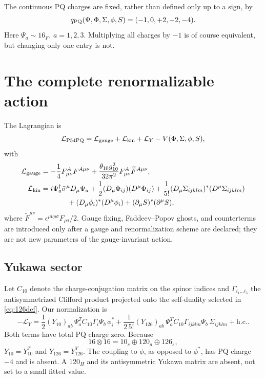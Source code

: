 \documentclass[11pt]{article}
\newcommand{\hc}{\mathrm{h.c.}}
\newcommand{\Lag}{\mathcal L}
\begin{document}
The continuous PQ charges are fixed, rather than defined only up to a sign,
by
\begin{equation}
 q_{\rm PQ}(\Psi,\Phi,\Sigma,\phi,S)=(-1,0,+2,-2,-4).
 \label{eq:pqcharges}
\end{equation}
Here $\Psi_a\sim16_F$, $a=1,2,3$.  Multiplying all charges by $-1$ is of
course equivalent, but changing only one entry is not.

\section{The complete renormalizable action}

The Lagrangian is
\begin{equation}
 \Lag_{\rm P54PQ}=\Lag_{\rm gauge}+\Lag_{\rm kin}
 +\Lag_Y-V(\Phi,\Sigma,\phi,S),
 \label{eq:full-action}
\end{equation}
with
\begin{align}
 \Lag_{\rm gauge}&=-\frac14F^A_{\mu\nu}F^{A\mu\nu}
 +\frac{\theta_{10}g_{10}^2}{32\pi^2}
 F^A_{\mu\nu}\widetilde F^{A\mu\nu},\\
 \Lag_{\rm kin}&=i\Psi_a^\dagger\bar\sigma^\mu D_\mu\Psi_a
 +\frac12(D_\mu\Phi_{ij})(D^\mu\Phi_{ij})
 +\frac1{5!}(D_\mu\Sigma_{ijklm})^*(D^\mu\Sigma_{ijklm})\nonumber\\
 &\hspace{13mm}+(D_\mu\phi_i)^*(D^\mu\phi_i)
 +(\partial_\mu S)^*(\partial^\mu S),
 \label{eq:kinetic}
\end{align}
where $\widetilde F^{\mu\nu}=\epsilon^{\mu\nu\rho\sigma}F_{\rho\sigma}/2$.
Gauge fixing, Faddeev--Popov ghosts, and counterterms are introduced only
after a gauge and renormalization scheme are declared; they are not new
parameters of the gauge-invariant action.

\subsection{Yukawa sector}

Let $C_{10}$ denote the charge-conjugation matrix on the spinor indices and
$\Gamma_{i_1\ldots i_5}$ the antisymmetrized Clifford product projected onto
the self-duality selected in \eqref{eq:126def}.  Our normalization is
\begin{equation}
 -\Lag_Y=
 \frac12(Y_{10})_{ab}\,\Psi_a^TC_{10}\Gamma_i\Psi_b\,\phi_i^*
 +\frac{1}{2\,5!}(Y_{126})_{ab}\,\Psi_a^TC_{10}
 \Gamma_{ijklm}\Psi_b\,\Sigma_{ijklm}+\hc .
 \label{eq:yukawa}
\end{equation}
Both terms have total PQ charge zero.  Because
\begin{equation}
 16\otimes16=10_s\oplus120_a\oplus126_s,
\end{equation}
$Y_{10}=Y_{10}^T$ and $Y_{126}=Y_{126}^T$.  The coupling to $\phi$, as
opposed to $\phi^*$, has PQ charge $-4$ and is absent.  A $120_H$ and its
antisymmetric Yukawa matrix are absent, not set to a small fitted value.
\end{document}
